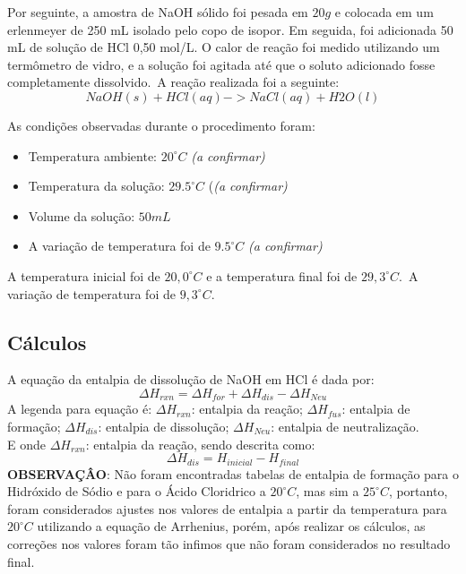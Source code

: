         \indent Por seguinte, a amostra de NaOH sólido foi pesada em $20g$ e colocada em um erlenmeyer de 250 mL isolado pelo copo de isopor. Em seguida, foi adicionada 50 mL de solução de HCl 0,50 mol/L. O calor de reação foi medido utilizando um termômetro de vidro, e a solução foi agitada até que o soluto adicionado fosse completamente dissolvido.\ A reação realizada foi a seguinte:\
        \begin{equation}
            {NaOH(s) + HCl(aq) -> NaCl(aq) + H2O(l)}
            \label{eq:equação principal NaOH sólido}
        \end{equation}
    	
    	\indent As condições observadas durante o procedimento foram:
    	\begin{itemize}
    		\item Temperatura ambiente: $20^{\circ}C$ \textit{(a confirmar)}
    		\item Temperatura da solução: $29.5^{\circ}C$ (\textit{(a confirmar)}
    		\item Volume da solução: $50 mL$
    		\item A variação de temperatura foi de $9.5^{\circ}C$ \textit{(a confirmar)}
    	\end{itemize}
    
    	\indent A temperatura inicial foi de $20,0^{\circ} C$ e a temperatura final foi de $29,3^{\circ}C$.\ A variação de temperatura foi de $9,3^{\circ} C$.\\
                

        \subsection{Cálculos}\label{sec:calculos}
            \indent A equação da entalpia de dissolução de NaOH em HCl é dada por:
            \begin{equation}
                \Delta H_{rxn} = \Delta H_{for} + \Delta H_{dis} - \Delta H_{Neu}\label{eq:equacao de entalpia geral}
            \end{equation}
			\indent A legenda para equação é: $\Delta H_{rxn}$: entalpia da reação; $\Delta H_{fus}$: entalpia de formação; $\Delta H_{dis}$: entalpia de dissolução; $\Delta H_{Neu}$: entalpia de neutralização.\\
			\indent E onde $\Delta H_{rxn}$: entalpia da reação, sendo descrita como:\
			\begin{equation}
				\Delta H_{dis} = H_{inicial} - H_{final}\label{eq:equation1}
            \end{equation}
			\indent \textbf{OBSERVAÇÂO}: Não foram encontradas tabelas de entalpia de formação para o Hidróxido de Sódio e para o Ácido Cloridrico a $20^{\circ}C$, mas sim a
            $25^{\circ}C$, portanto, foram considerados ajustes nos valores de entalpia a partir da temperatura para $20^{\circ}C$ utilizando a equação de Arrhenius, porém, após realizar os cálculos, as correções nos valores foram tão infimos que não foram considerados no resultado final.\\
            
